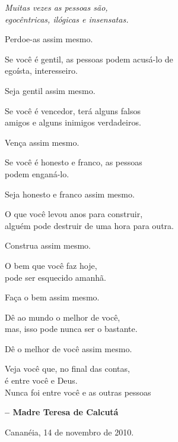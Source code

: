 {
    \Large
    \centering
    \itshape
    Muitas vezes as pessoas são,\\
    egocêntricas, ilógicas e insensatas.

    Perdoe-as assim mesmo.

    \vspace{1em}

    Se você é gentil, as pessoas podem acusá-lo de\\
    egoísta, interesseiro.

    Seja gentil assim mesmo.

    \vspace{1em}

    Se você é vencedor, terá alguns falsos\\
    amigos e alguns inimigos verdadeiros.

    Vença assim mesmo.

    \vspace{1em}

    Se você é honesto e franco, as pessoas\\
    podem enganá-lo.

    Seja honesto e franco assim mesmo.

    \vspace{1em}

    O que você levou anos para construir,\\
    alguém pode destruir de uma hora para outra.

    Construa assim mesmo.

    \vspace{1em}

    O bem que você faz hoje,\\
    pode ser esquecido amanhã.

    Faça o bem assim mesmo.

    \vspace{1em}

    Dê ao mundo o melhor de você,\\
    mas, isso pode nunca ser o bastante.

    Dê o melhor de você assim mesmo.

    \vspace{1em}

    Veja você que, no final das contas,\\
    é entre você e Deus.\\
    Nunca foi entre você e as outras pessoas

}

\vspace{2em}

\begin{flushleft}
    \textbf{-- Madre Teresa de Calcutá}
\end{flushleft}

\vfill

\begin{flushright}
    Cananéia, 14 de novembro de 2010.
\end{flushright}